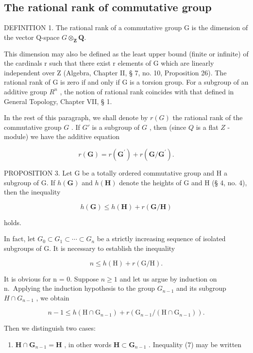 \subsection{The rational rank of commutative group}

DEFINITION 1. The rational rank of a commutative group G is the dimension of the vector Q-space \(G \otimes_{\mathbf{Z}} \mathbf{Q}\).

This dimension may also be defined as the least upper bound (finite or infinite) of the cardinals r such that there exist r elements of G which are linearly independent over Z (Algebra, Chapter II, § 7, no. 10, Proposition 26). The rational rank of G is zero if and only if G is a torsion group. For a subgroup of an additive group \(R^{n}\) , the notion of rational rank coincides with that defined in General Topology, Chapter VII, § 1.

In the rest of this paragraph, we shall denote by \(r(G)\) the rational rank of the commutative group \(G\) . If \(G'\) is a subgroup of \(G\) , then (since \(Q\) is a flat \(Z\) -module) we have the additive equation

\[
r (\mathbf {G}) = r \left(\mathbf {G} ^ {\prime}\right) + r \left(\mathbf {G} / \mathbf {G} ^ {\prime}\right).\tag{4}
\]

PROPOSITION 3. Let G be a totally ordered commutative group and H a subgroup of G. If \(h(\mathbf{G})\) and \(h(\mathbf{H})\) denote the heights of G and H (§ 4, no. 4), then the inequality

\[
h (\mathbf {G}) \leqslant h (\mathbf {H}) + r (\mathbf {G} / \mathbf {H})\tag{5}
\]

holds.

In fact, let \(G_{0} \subset G_{1} \subset \cdots \subset G_{n}\) be a strictly increasing sequence of isolated subgroups of G. It is necessary to establish the inequality

\[
n \leqslant h (\mathrm{H}) + r (\mathrm{G} / \mathrm{H}).\tag{6}
\]

It is obvious for n = 0. Suppose \(n \geqslant 1\) and let us argue by induction on n.~Applying the induction hypothesis to the group \(G_{n-1}\) and its subgroup \(H \cap G_{n-1}\) , we obtain

\[
n - 1 \leqslant h (\mathrm{H} \cap \mathrm{G} _ {n - 1}) + r (\mathrm{G} _ {n - 1} / (\mathrm{H} \cap \mathrm{G} _ {n - 1})).\tag{7}
\]

Then we distinguish two cases:

\begin{enumerate}
\def\labelenumi{(\alph{enumi})}
\tightlist
\item
  \(\mathbf{H} \cap \mathbf{G}_{n-1} = \mathbf{H}\) , in other words \(\mathbf{H} \subset \mathbf{G}_{n-1}\) . Inequality (7) may be written
\end{enumerate}


